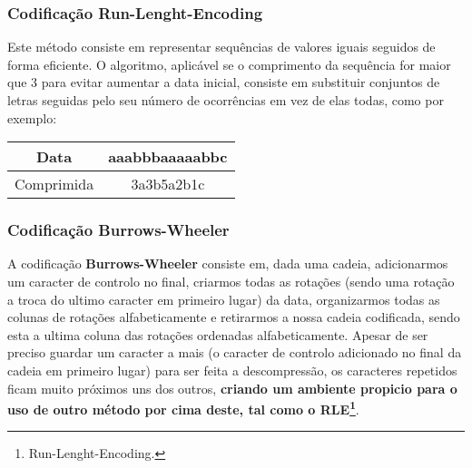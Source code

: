 \documentclass[10pt,journal,compsoc]{IEEEtran}
\begin{document}
    \subsubsection{Codificação \textbf{Run-Lenght-Encoding}}
    Este método consiste em representar sequências de valores iguais seguidos de forma eficiente. O algoritmo, aplicável se o comprimento da sequência for maior que 3 para evitar aumentar a data inicial, consiste em substituir conjuntos de letras seguidas pelo seu número de ocorrências em vez de elas todas, como por exemplo:
    
    \begin{center}
    \begin{tabular}{ |c|c| } 
      \hline
      Data & aaabbbaaaaabbc \\
      \hline
      Comprimida & 3a3b5a2b1c \\
      \hline
    \end{tabular}
    \end{center}
    
    
    \subsubsection{Codificação \textbf{Burrows-Wheeler}}
    A codificação \textbf{Burrows-Wheeler} consiste em, dada uma cadeia, adicionarmos um caracter de controlo no final, criarmos todas as rotações (sendo uma rotação a troca do ultimo caracter em primeiro lugar) da data, organizarmos todas as colunas de rotações alfabeticamente e retirarmos a nossa cadeia codificada, sendo esta a ultima coluna das rotações ordenadas alfabeticamente.
    Apesar de ser preciso guardar um caracter a mais (o caracter de controlo adicionado no final da cadeia em primeiro lugar) para ser feita a descompressão, os caracteres repetidos ficam muito próximos uns dos outros, \textbf{criando um ambiente propicio para o uso de outro método por cima deste, tal como o RLE\footnote{Run-Lenght-Encoding.}}.
    
\end{document}
